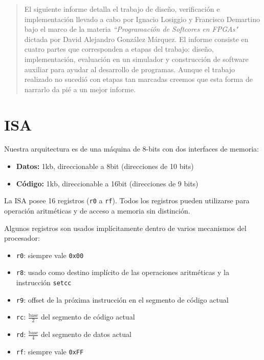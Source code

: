 \documentclass{article}
\begin{document}

\fecha{\today}



\maketitle

\begin{abstract}
El siguiente informe detalla el trabajo de diseño, verificación e implementación llevado a cabo por Ignacio Losiggio y Francisco Demartino bajo el marco de la materia \emph{``Programación de Softcores en FPGAs"} dictada por David Alejandro González Márquez. El informe consiste en cuatro partes que corresponden a etapas del trabajo: diseño, implementación, evaluación en un simulador y construcción de software auxiliar para ayudar al desarrollo de programas. Aunque el trabajo realizado no sucedió con etapas tan marcadas creemos que esta forma de narrarlo da pié a un mejor informe.
\end{abstract}

\tableofcontents

\newpage

\section{ISA}

Nuestra arquitectura es de una máquina de 8-bits con dos interfaces de memoria:
\begin{itemize}
    \item \textbf{Datos:}  1kb, direccionable a 8bit (direcciones de 10 bits)
    \item \textbf{Código:} 1kb, direccionable a 16bit (direcciones de 9 bits)
\end{itemize}

La ISA posee 16 registros (\texttt{r0} a \texttt{rf}). Todos los registros pueden utilizarse para operación aritméticas y de acceso a memoria sin distinción.

Algunos registros son usados implícitamente dentro de varios mecanismos del procesador:
\begin{itemize}
    \item \texttt{r0}: siempre vale \texttt{0x00}
    \item \texttt{r8}: usado como destino implícito de las operaciones aritméticas y la instrucción \texttt{setcc}
    \item \texttt{r9}: offset de la próxima instrucción en el segmento de código actual
    \item \texttt{rc}: $\frac{\text{base}}{2}$ del segmento de código actual
    \item \texttt{rd}: $\frac{\text{base}}{4}$ del segmento de datos actual
    \item \texttt{rf}: siempre vale \texttt{0xFF}
\end{itemize}
\end{document}
